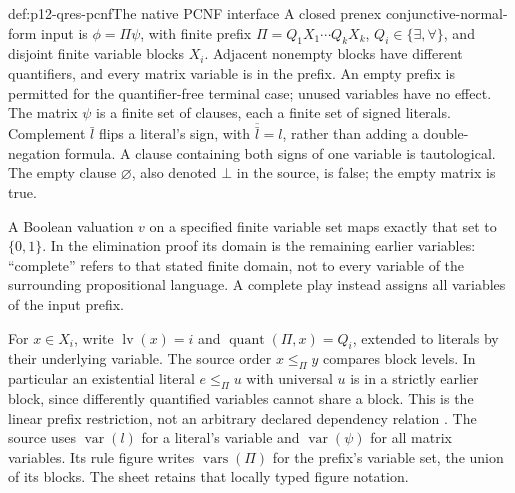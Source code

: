\begin{hbdefinition}{def:p12-qres-pcnf}{The native PCNF interface}
A closed prenex conjunctive-normal-form input is \(\phi=\Pi\psi\), with
finite prefix \(\Pi=Q_1X_1\cdots Q_kX_k\),
\(Q_i\in\{\exists,\forall\}\), and disjoint finite variable blocks
\(X_i\).  Adjacent nonempty blocks have different quantifiers, and every
matrix variable is in the prefix.  An empty prefix is permitted for the
quantifier-free terminal case; unused variables have no effect.  The matrix
\(\psi\) is a finite set of clauses, each a finite set of signed literals.
Complement \(\bar l\) flips a literal's sign, with
\(\overline{\bar l}=l\), rather than adding a double-negation formula.
A clause containing both signs of one variable is tautological.  The empty
clause \(\varnothing\), also denoted \(\bot\) in the source, is false;
the empty matrix is true.

A Boolean valuation \(v\) on a specified finite variable set maps
exactly that set to \(\{0,1\}\). In the elimination proof its domain
is the remaining earlier variables: ``complete'' refers to that stated
finite domain, not to every variable of the surrounding propositional
language. A complete play instead assigns all variables of the input prefix.

For \(x\in X_i\), write \(\operatorname{lv}(x)=i\) and
\(\operatorname{quant}(\Pi,x)=Q_i\), extended to literals by their
underlying variable.  The source order \(x\leq_\Pi y\) compares block
levels.  In particular an existential literal \(e\leq_\Pi u\) with
universal \(u\) is in a strictly earlier block, since differently quantified
variables cannot share a block.  This is the linear prefix restriction, not
an arbitrary declared dependency relation
\cite[Sec.~2.2]{BeyersdorffEtAl2021QBFJulyAuthor}.
The source uses \(\operatorname{var}(l)\) for a literal's variable and
\(\operatorname{var}(\psi)\) for all matrix variables.  Its rule figure
writes \(\operatorname{vars}(\Pi)\) for the prefix's variable set, the
union of its blocks.  The sheet retains that locally typed figure notation.
\end{hbdefinition}

